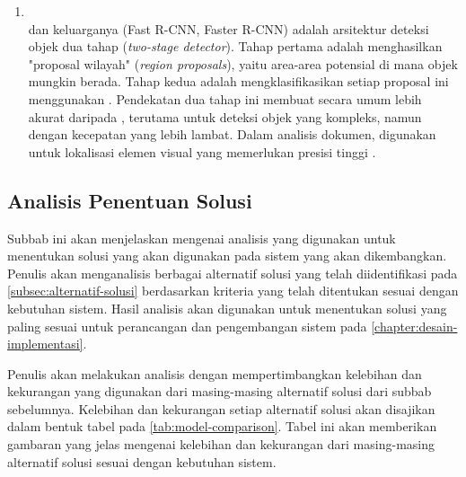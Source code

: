 \begin{enumerate}
    \item \rcnn{} ~\\ \rcnn{} dan keluarganya (Fast R-CNN, Faster R-CNN) adalah arsitektur deteksi objek dua tahap (\textit{two-stage detector}). Tahap pertama adalah menghasilkan "proposal wilayah" (\textit{region proposals}), yaitu area-area potensial di mana objek mungkin berada. Tahap kedua adalah mengklasifikasikan setiap proposal ini menggunakan \cnn. Pendekatan dua tahap ini membuat \rcnn{} secara umum lebih akurat daripada \yolo, terutama untuk deteksi objek yang kompleks, namun dengan kecepatan yang lebih lambat. Dalam analisis dokumen, \rcnn{} digunakan untuk lokalisasi elemen visual yang memerlukan presisi tinggi \parencite{xie2021oriented}.
\end{enumerate}

\subsection{Analisis Penentuan Solusi}
\label{subsec:analisis-penentuan-solusi}

Subbab ini akan menjelaskan mengenai analisis yang digunakan untuk menentukan solusi yang akan digunakan pada sistem yang akan dikembangkan. Penulis akan menganalisis berbagai alternatif solusi yang telah diidentifikasi pada \autoref{subsec:alternatif-solusi} berdasarkan kriteria yang telah ditentukan sesuai dengan kebutuhan sistem. Hasil analisis akan digunakan untuk menentukan solusi yang paling sesuai untuk perancangan dan pengembangan sistem pada \autoref{chapter:desain-implementasi}.

Penulis akan melakukan analisis dengan mempertimbangkan kelebihan dan kekurangan yang digunakan dari masing-masing alternatif solusi dari subbab sebelumnya. Kelebihan dan kekurangan setiap alternatif solusi akan disajikan dalam bentuk tabel pada \autoref{tab:model-comparison}. Tabel ini akan memberikan gambaran yang jelas mengenai kelebihan dan kekurangan dari masing-masing alternatif solusi sesuai dengan kebutuhan sistem.
\pagebreak


